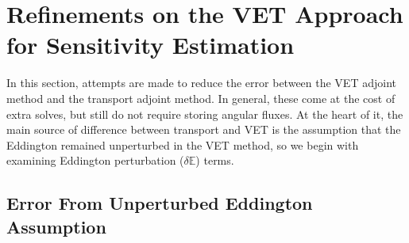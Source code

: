 \documentclass[12pt]{report}
\newcommand{\Edd}{\mathbb{E}}
\begin{document}
\section{Refinements on the VET Approach for Sensitivity Estimation}

In this section, attempts are made to reduce the error between the VET adjoint method and the transport adjoint method. In general, these come at the cost of extra solves, but still do not require storing angular fluxes. At the heart of it, the main source of difference between transport and VET is the assumption that the Eddington remained unperturbed in the VET method, so we begin with examining Eddington perturbation ($\delta \Edd$) terms. 
\subsection{Error From Unperturbed Eddington Assumption}
\end{document}
